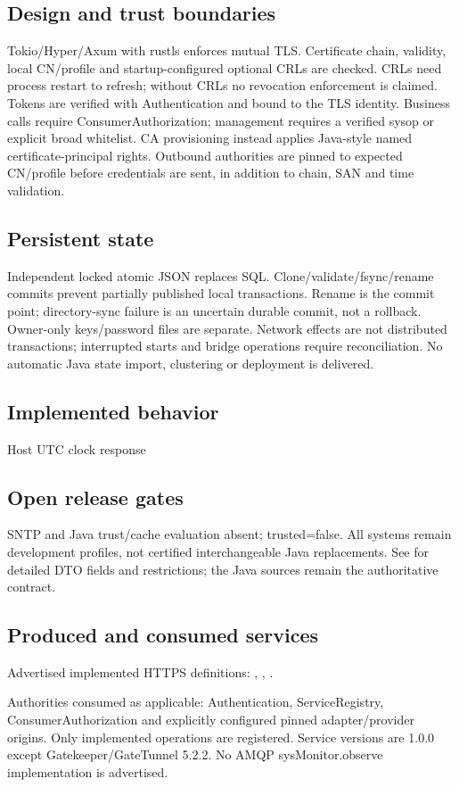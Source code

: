 \documentclass[a4paper]{arrowhead}
\begin{document}
\subsection{Design and trust boundaries}
Tokio/Hyper/Axum with rustls enforces mutual TLS. Certificate chain, validity, local CN/profile and startup-configured optional CRLs are checked. CRLs need process restart to refresh; without CRLs no revocation enforcement is claimed. Tokens are verified with Authentication and bound to the TLS identity. Business calls require ConsumerAuthorization; management requires a verified sysop or explicit broad whitelist. CA provisioning instead applies Java-style named certificate-principal rights. Outbound authorities are pinned to expected CN/profile before credentials are sent, in addition to chain, SAN and time validation.
\subsection{Persistent state}
Independent locked atomic JSON replaces SQL. Clone/validate/fsync/rename commits prevent partially published local transactions. Rename is the commit point; directory-sync failure is an uncertain durable commit, not a rollback. Owner-only keys/password files are separate. Network effects are not distributed transactions; interrupted starts and bridge operations require reconciliation. No automatic Java state import, clustering or deployment is delivered.
\subsection{Implemented behavior}
Host UTC clock response
\subsection{Open release gates}
SNTP and Java trust/cache evaluation absent; trusted=false. All systems remain development profiles, not certified interchangeable Java replacements. See  for detailed DTO fields and restrictions; the Java sources remain the authoritative contract.
\subsection{Produced and consumed services}
Advertised implemented HTTPS definitions: , \allowbreak {}, \allowbreak {}.\par
Authorities consumed as applicable: Authentication, ServiceRegistry, ConsumerAuthorization and explicitly configured pinned adapter/provider origins. Only implemented operations are registered. Service versions are 1.0.0 except Gatekeeper/GateTunnel 5.2.2. No AMQP sysMonitor.observe implementation is advertised.
\clearpage
\end{document}
